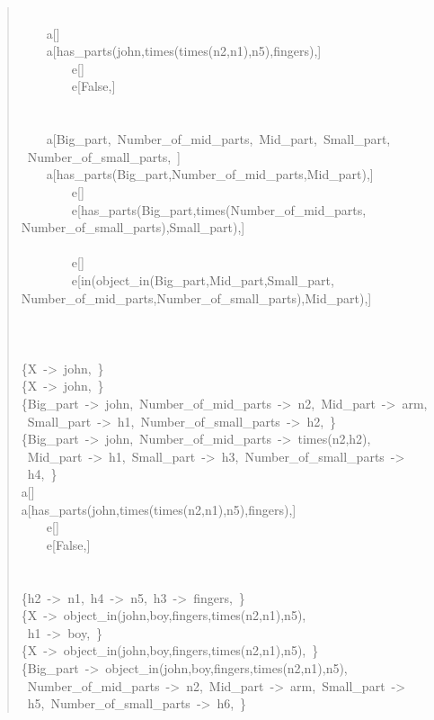 \begin{quote}
~\\
~~~~a[]\\
~~~~a[has\_parts(john,times(times(n2,n1),n5),fingers),]\\
~~~~~~~~e[]\\
~~~~~~~~e[False,]\\
~\\
~\\
~~~~a[Big\_part,~Number\_of\_mid\_parts,~Mid\_part,~Small\_part,\\ ~Number\_of\_small\_parts,~]\\
~~~~a[has\_parts(Big\_part,Number\_of\_mid\_parts,Mid\_part),]\\
~~~~~~~~e[]\\
~~~~~~~~e[has\_parts(Big\_part,times(Number\_of\_mid\_parts,\\ Number\_of\_small\_parts),Small\_part),]\\
~\\
~~~~~~~~e[]\\
~~~~~~~~e[in(object\_in(Big\_part,Mid\_part,Small\_part,\\ Number\_of\_mid\_parts,Number\_of\_small\_parts),Mid\_part),]\\
~\\
~\\
~\\
\{X~->~john,~\}\\
\{X~->~john,~\}\\
\{Big\_part~->~john,~Number\_of\_mid\_parts~->~n2,~Mid\_part~->~arm,\\ ~Small\_part~->~h1,~Number\_of\_small\_parts~->~h2,~\}\\
\{Big\_part~->~john,~Number\_of\_mid\_parts~->~times(n2,h2),\\ ~Mid\_part~->~h1,~Small\_part~->~h3,~Number\_of\_small\_parts~->\\~h4,~\}\\
a[]\\
a[has\_parts(john,times(times(n2,n1),n5),fingers),]\\
~~~~e[]\\
~~~~e[False,]\\
~\\
~\\
\{h2~->~n1,~h4~->~n5,~h3~->~fingers,~\}\\
\{X~->~object\_in(john,boy,fingers,times(n2,n1),n5),\\ ~h1~->~boy,~\}\\
\{X~->~object\_in(john,boy,fingers,times(n2,n1),n5),~\}\\
\{Big\_part~->~object\_in(john,boy,fingers,times(n2,n1),n5),\\ ~Number\_of\_mid\_parts~->~n2,~Mid\_part~->~arm,~Small\_part~->\\~h5,~Number\_of\_small\_parts~->~h6,~\}\\

\end{quote}
